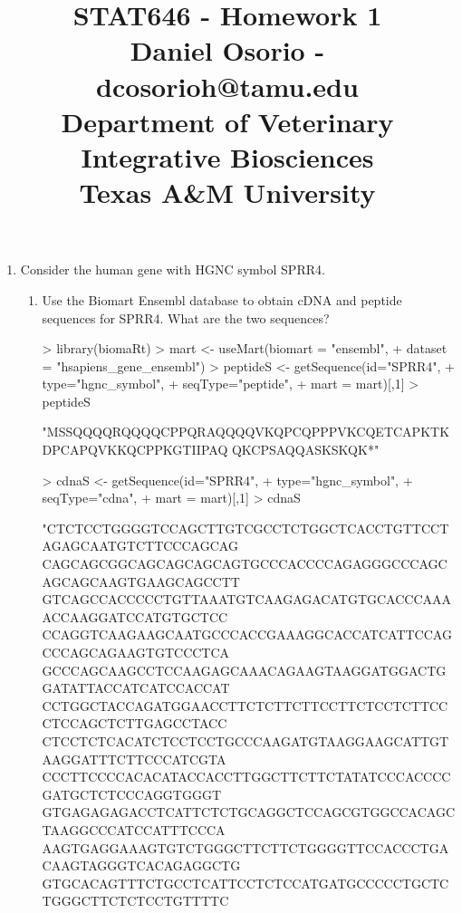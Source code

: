 \documentclass[12pt,a4paper]{paper}
\begin{document}
\title{STAT646 - Homework 1\\\small{Daniel Osorio - dcosorioh@tamu.edu\\Department of Veterinary Integrative Biosciences\\Texas A\&M University}}
\maketitle

\begin{enumerate}
\item Consider the human gene with HGNC symbol SPRR4.
\begin{enumerate}
\item Use the Biomart Ensembl database to obtain cDNA and peptide sequences for SPRR4.
What are the two sequences?
\begin{Schunk}
\begin{Sinput}
> library(biomaRt)
> mart <- useMart(biomart = "ensembl", 
+                 dataset = "hsapiens_gene_ensembl")
> peptideS <- getSequence(id="SPRR4", 
+                         type="hgnc_symbol", 
+                         seqType="peptide", 
+                         mart = mart)[,1]
> peptideS
\end{Sinput}
\begin{Soutput}
[1] "MSSQQQQRQQQQCPPQRAQQQQVKQPCQPPPVKCQETCAPKTKDPCAPQVKKQCPPKGTIIPAQ
     QKCPSAQQASKSKQK*"
\end{Soutput}
\begin{Sinput}
> cdnaS <- getSequence(id="SPRR4", 
+                      type="hgnc_symbol", 
+                      seqType="cdna", 
+                      mart = mart)[,1]
> cdnaS
\end{Sinput}
\begin{Soutput}
[1] "CTCTCCTGGGGTCCAGCTTGTCGCCTCTGGCTCACCTGTTCCTAGAGCAATGTCTTCCCAGCAG
     CAGCAGCGGCAGCAGCAGCAGTGCCCACCCCAGAGGGCCCAGCAGCAGCAAGTGAAGCAGCCTT
     GTCAGCCACCCCCTGTTAAATGTCAAGAGACATGTGCACCCAAAACCAAGGATCCATGTGCTCC
     CCAGGTCAAGAAGCAATGCCCACCGAAAGGCACCATCATTCCAGCCCAGCAGAAGTGTCCCTCA
     GCCCAGCAAGCCTCCAAGAGCAAACAGAAGTAAGGATGGACTGGATATTACCATCATCCACCAT
     CCTGGCTACCAGATGGAACCTTCTCTTCTTCCTTCTCCTCTTCCCTCCAGCTCTTGAGCCTACC
     CTCCTCTCACATCTCCTCCTGCCCAAGATGTAAGGAAGCATTGTAAGGATTTCTTCCCATCGTA
     CCCTTCCCCACACATACCACCTTGGCTTCTTCTATATCCCACCCCGATGCTCTCCCAGGTGGGT
     GTGAGAGAGACCTCATTCTCTGCAGGCTCCAGCGTGGCCACAGCTAAGGCCCATCCATTTCCCA
     AAGTGAGGAAAGTGTCTGGGCTTCTTCTGGGGTTCCACCCTGACAAGTAGGGTCACAGAGGCTG
     GTGCACAGTTTCTGCCTCATTCCTCTCCATGATGCCCCCTGCTCTGGGCTTCTCTCCTGTTTTC

\end{Soutput}
\end{Schunk}
\end{enumerate}
\end{enumerate}
\end{document}
